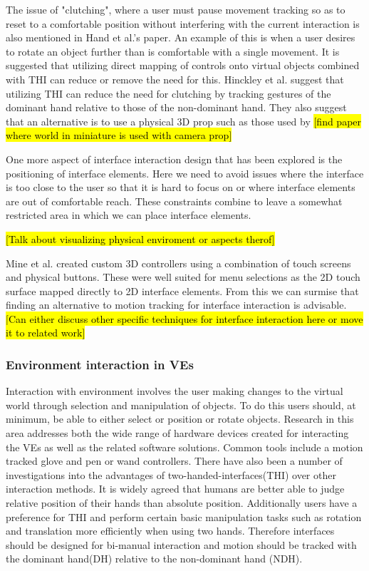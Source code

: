 \documentclass{sig-alternate-05-2015}
\begin{document}
 The issue of "clutching", where a user must pause movement tracking so as to reset to a comfortable position without interfering with the current interaction is also mentioned in Hand et al.'s paper.\cite{Hand1997} An example of this is when a user desires to rotate an object further than is comfortable with a single movement. It is suggested that utilizing direct mapping of controls onto virtual objects combined with THI can reduce or remove the need for this.\cite{Hand1997}  Hinckley et al. suggest that utilizing THI can reduce the need for clutching by tracking gestures of the dominant hand relative to those of the non-dominant hand.\cite{Hinckley1994} They also suggest that an alternative is to use a physical 3D prop such as those used by \hl{[find paper where world in miniature is used with camera prop]}
 
 One more aspect of interface interaction design that has been explored is the positioning of interface elements.\cite{alger2015visual} Here we need to avoid issues where the interface is too close to the user so that it is hard to focus on or where interface elements are out of comfortable reach. These constraints combine to leave a somewhat restricted area in which we can place interface elements.
 
 \hl{[Talk about visualizing physical enviroment or aspects therof]}
 
 Mine et al. created custom 3D controllers using a combination of touch screens and physical buttons.\cite{Mine2014} These were well suited for menu selections as the 2D touch surface mapped directly to 2D interface elements. From this we can surmise that finding an alternative to motion tracking for interface interaction is advisable. \hl{[Can either discuss other specific techniques for interface interaction here or move it to related work]}
 
 
\subsubsection{Environment interaction in VEs}
 Interaction with environment involves the user making changes to the virtual world through selection and manipulation of objects. To do this users should, at minimum, be able to either select or position or rotate objects\cite{Bowman2001}. Research in this area addresses both the wide range of hardware devices created for interacting the VEs as well as the related software solutions. Common tools include a motion tracked glove \cite{Zimmerman1986} and pen or wand controllers\cite{Schultheis2012}. 
 There have also been a number of investigations into the advantages of two-handed-interfaces(THI) over other interaction methods. It is widely agreed that humans are better able to judge relative position of their hands than absolute position.\cite{Bowman1998, Buxton1986} Additionally users have a preference for THI\cite{Buxton1986} and perform certain basic manipulation tasks such as rotation and translation more efficiently when using two hands\cite{Schultheis2012,Balakrishnan1999}. Therefore interfaces should be designed for bi-manual interaction and motion should be tracked with the dominant hand(DH) relative to the non-dominant hand (NDH)\cite{Hinckley1994}.
 
\end{document}

